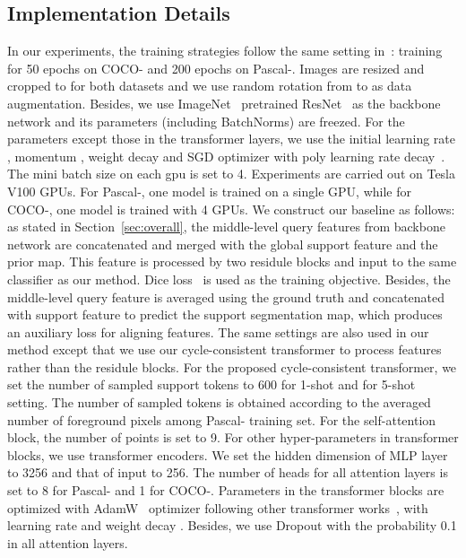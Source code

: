 \documentclass{article}
\begin{document}
\subsection{Implementation Details}
\label{sec:detail}
In our experiments, the training strategies follow the same setting in~\cite{tian2020pfenet}: training for 50 epochs on COCO- and 200 epochs on Pascal-. Images are resized and cropped to  for both datasets and we use random rotation from  to  as data augmentation. Besides, we use ImageNet~\cite{russakovsky2015imagenet} pretrained ResNet~\cite{he2015resnet} as the backbone network and its parameters (including BatchNorms) are freezed.  For the parameters except those in the transformer layers, we use the initial learning rate , momentum , weight decay  and SGD optimizer with poly learning rate decay~\cite{chen2017deeplab}. The mini batch size on each gpu is set to 4. Experiments are carried out on Tesla V100 GPUs. For Pascal-, one model is trained on a single GPU, while for COCO-, one model is trained with 4 GPUs. We construct our baseline as follows: as stated in Section~\ref{sec:overall}, the middle-level query features from backbone network are concatenated and merged with the global support feature and the prior map. This feature is processed by two residule blocks and input to the same classifier as our method. Dice loss~\cite{milletari2016diceloss} is used as the training objective. Besides, the middle-level query feature is averaged using the ground truth and concatenated with support feature to predict the support segmentation map, which produces an auxiliary loss for aligning features. The same settings are also used in our method except that we use our cycle-consistent transformer to process features rather than the residule blocks. For the proposed cycle-consistent transformer, we set the number of sampled support tokens  to 600 for 1-shot and  for 5-shot setting. The number of sampled tokens is obtained according to the averaged number of foreground pixels among Pascal- training set. For the self-attention block, the number of points  
is set to 9. For other hyper-parameters in transformer blocks, we use  transformer encoders. We set the hidden dimension of MLP layer to 3256 and that of input to 256.
The number of heads for all attention layers is set to 8 for Pascal- and 1 for COCO-.
Parameters in the transformer blocks are optimized with AdamW~\cite{loshchilov2017decoupled} optimizer following other transformer works~\cite{carion2020detr,dosovitskiy2020vit,touvron2020deit}, with learning rate  and weight decay . Besides, we use Dropout with the probability 0.1 in all attention layers.
\end{document}
